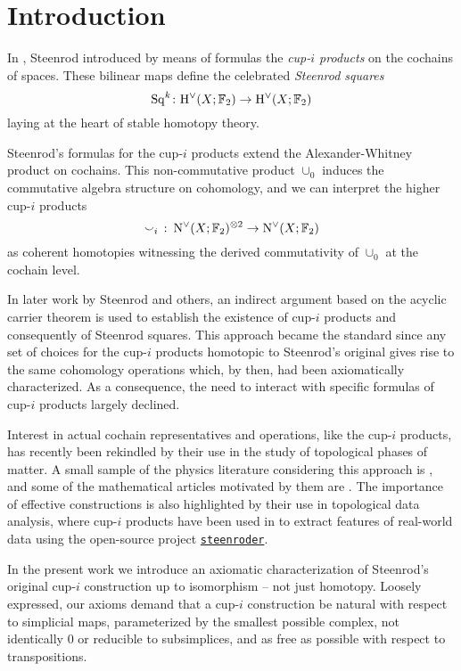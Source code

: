 
\section{Introduction}\label{s:introduction}

In \cite{steenrod1947products}, Steenrod introduced by means of formulas the \textit{\mbox{cup-$i$} products} on the cochains of spaces.
These bilinear maps define the celebrated \textit{Steenrod squares}
\[
\operatorname{Sq}^k \colon \mathrm{H}^\vee(X; {\mathbb{F}_2}) \to \mathrm{H}^\vee(X; {\mathbb{F}_2})
\]
laying at the heart of stable homotopy theory.

Steenrod's formulas for the \mbox{cup-$i$} products extend the Alexander-Whitney product on cochains.
This non-commutative product $\cup_0$ induces the commutative algebra structure on cohomology, and we can interpret the higher \mbox{cup-$i$} products
\[
\smallsmile_i\ \colon \operatorname{N^{\vee}}(X; {\mathbb{F}_2})^{\otimes 2} \to \operatorname{N^{\vee}}(X; {\mathbb{F}_2})
\]
as coherent homotopies witnessing the derived commutativity of $\cup_0$ at the cochain level.

In later work by Steenrod and others, an indirect argument based on the acyclic carrier theorem is used to establish the existence of \mbox{cup-$i$} products and consequently of Steenrod squares.
This approach became the standard since any set of choices for the \mbox{cup-$i$} products homotopic to Steenrod's original gives rise to the same cohomology operations which, by then, had been axiomatically characterized.
As a consequence, the need to interact with specific formulas of \mbox{cup-$i$} products largely declined.

Interest in actual cochain representatives and operations, like the \mbox{cup-$i$} products, has recently been rekindled by their use in the study of topological phases of matter.
A small sample of the physics literature considering this approach is \cite{gaiotto2016spin, kapustin2017fermionic, meng2018classification, wang2020construction, barkeshli2021classification, tata2021anomalies, tata2021cubical}, and some of the mathematical articles motivated by them are \cite{brumfiel2016pontrjagin, brumfiel2018pontrjagin, medina2020cartan, medina2021adem}.
The importance of effective constructions is also highlighted by their use in topological data analysis, where cup-$i$ products have been used in \cite{medina2022per_st} to extract features of real-world data using the open-source project \href{https://github.com/Steenroder/steenroder}{\texttt{steenroder}}.

In the present work we introduce an axiomatic characterization of Steenrod's original cup-$i$ construction up to isomorphism -- not just homotopy.
Loosely expressed, our axioms demand that a cup-$i$ construction be natural with respect to simplicial maps, parameterized by the smallest possible complex, not identically $0$ or reducible to subsimplices, and as free as possible with respect to transpositions.

